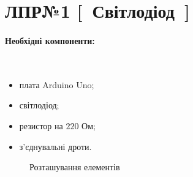 \documentclass[12pt,a4paper]{report}  %
\begin{document}
\section{ЛПР№1 [~Світлодіод~]}

\paragraph{Необхідні компоненти:} \textbf{~}\\

\begin{minipage}{0.45\textwidth}

\begin{spacing}{0.5}
\begin{itemize}
\item плата Arduino Uno;
\item світлодіод;
\end{itemize}
\end{spacing}

\end{minipage}
\hfill
\begin{minipage}{0.45\textwidth}

\begin{spacing}{0.5}
\begin{itemize}
\item резистор на $220\text{~Ом}$;
\item з'єднувальні дроти.
\end{itemize}
\end{spacing}

\end{minipage}

\begin{figure}[h!]
\caption{Розташування елементів}
\label{ris:image}
\end{figure}
\end{document}
